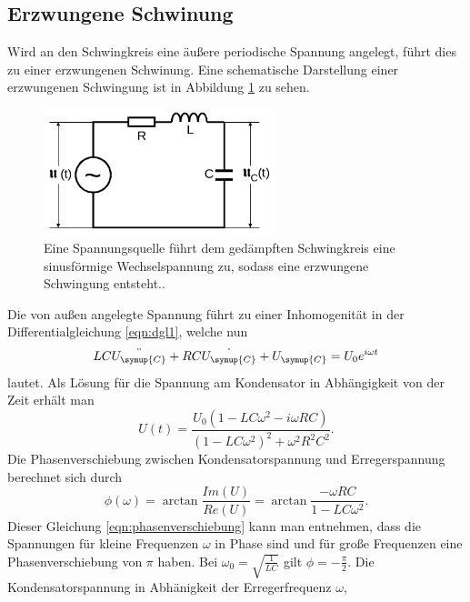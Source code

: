 \subsection{Erzwungene Schwinung}
Wird an den Schwingkreis eine äußere periodische Spannung angelegt, führt dies zu
einer erzwungenen Schwinung. Eine schematische Darstellung einer erzwungenen
Schwingung ist in Abbildung \ref{fig:erz_schwingung} zu sehen.
\begin{figure}
  \centering
  \includegraphics[width=0.6\textwidth]{erzwungene_schwingung.png}
  \caption{Eine Spannungsquelle führt dem gedämpften Schwingkreis eine sinusförmige
  Wechselspannung zu, sodass eine erzwungene Schwingung entsteht.\cite{sampel}.}
  \label{fig:erz_schwingung}
\end{figure}
Die von außen angelegte Spannung führt zu einer Inhomogenität in der Differentialgleichung
\eqref{eqn:dgl1}, welche nun
\begin{equation}
  L C \ddot{U_\symup{C}} + R C \dot{U_\symup{C}} + U_\symup{C} = U_0 e^{i\omega t}
  \label{eqn:dgl2}
\end{equation}
lautet. Als Lösung für die Spannung am Kondensator in Abhängigkeit von der Zeit
erhält man
\begin{equation}
  U(t) = \frac{U_0 (1 - L C \omega^2 - i \omega R C)}{(1 - L C \omega^2)^2 +
  \omega^2 R^2 C^2}.
  \label{eqn:loesung2}
\end{equation}
Die Phasenverschiebung zwischen Kondensatorspannung und Erregerspannung berechnet
sich durch
\begin{equation}
  \phi(\omega)=\arctan{\frac{Im(U)}{Re(U)}}
  = \arctan{\frac{-\omega R C}{1-L C \omega^2}}.
  \label{eqn:phasenverschiebung}
\end{equation}
Dieser Gleichung \eqref{eqn:phasenverschiebung} kann man entnehmen, dass die
Spannungen für kleine Frequenzen $\omega$ in Phase sind und für große Frequenzen
eine Phasenverschiebung von $\pi$ haben. Bei $\omega_0=\sqrt{\frac{1}{L C}}$ gilt
$\phi = -\frac{\pi}{2}$.\newline
Die Kondensatorspannung in Abhänigkeit der Erregerfrequenz $\omega$,
